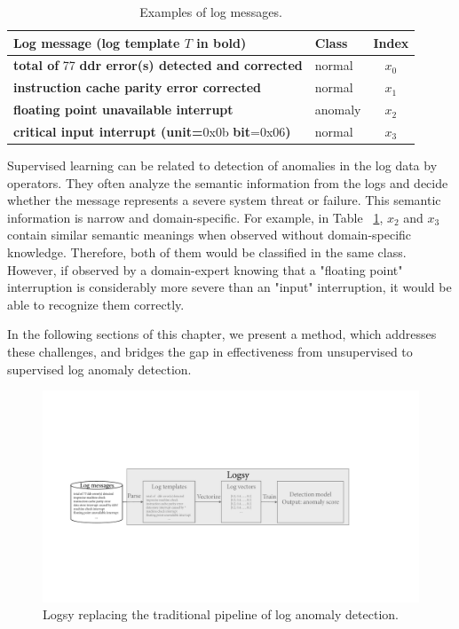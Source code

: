 \begin{table}[!t]
\centering
\begin{tabular}{l|l|c}
\hline
\textbf{Log message (log template $T$ in bold)} & \textbf{Class} & \textbf{Index}  \\ \hline
\textbf{total of} 77 \textbf{ddr error(s) detected and corrected}& normal & $x_0$    \\
\textbf{instruction cache parity error corrected} &normal & $x_1$    \\
\textbf{floating point unavailable interrupt}                             & anomaly       & $x_2$                 \\
\textbf{critical input interrupt (unit=}0x0b \textbf{bit}=0x06\textbf{)} &normal & $x_3$  \\ \hline
\end{tabular}
\caption{Examples of log messages.}
\label{tab:logmessagestemplates}
\end{table}

Supervised learning can be related to detection of anomalies in the log data by operators. They often analyze the semantic information from the logs and decide whether the message represents a severe system threat or failure. This semantic information is narrow and domain-specific. For example, in Table ~\ref{tab:logmessagestemplates}, $x_2$ and $x_3$ contain similar semantic meanings when observed without domain-specific knowledge. Therefore, both of them would be classified in the same class. However, if observed by a domain-expert knowing that a "floating point" interruption is considerably more severe than an "input" interruption, it would be able to recognize them correctly.

In the following sections of this chapter, we present a method, which addresses these challenges, and bridges the gap in effectiveness from unsupervised to supervised log anomaly detection.


\newpage 

\begin{figure}[!htbp]
\centerline{\includegraphics[width=1.0\textwidth]{gfx/chap5/logsypipeline.pdf}}
\caption{Logsy replacing the traditional pipeline of log anomaly detection.}
\label{fig:logsypipeline}
\end{figure}

